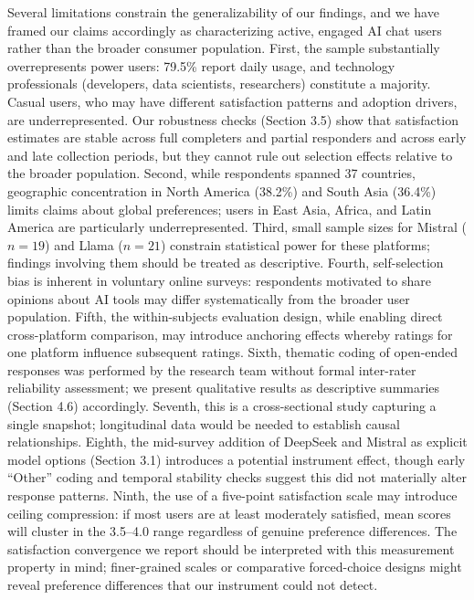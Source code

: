 \documentclass[10pt,twocolumn]{article}
\begin{document}
Several limitations constrain the generalizability of our findings, and we have framed our claims accordingly as characterizing active, engaged AI chat users rather than the broader consumer population. First, the sample substantially overrepresents power users: 79.5\% report daily usage, and technology professionals (developers, data scientists, researchers) constitute a majority. Casual users, who may have different satisfaction patterns and adoption drivers, are underrepresented. Our robustness checks (Section 3.5) show that satisfaction estimates are stable across full completers and partial responders and across early and late collection periods, but they cannot rule out selection effects relative to the broader population. Second, while respondents spanned 37 countries, geographic concentration in North America (38.2\%) and South Asia (36.4\%) limits claims about global preferences; users in East Asia, Africa, and Latin America are particularly underrepresented. Third, small sample sizes for Mistral ($n=19$) and Llama ($n=21$) constrain statistical power for these platforms; findings involving them should be treated as descriptive. Fourth, self-selection bias is inherent in voluntary online surveys: respondents motivated to share opinions about AI tools may differ systematically from the broader user population. Fifth, the within-subjects evaluation design, while enabling direct cross-platform comparison, may introduce anchoring effects whereby ratings for one platform influence subsequent ratings. Sixth, thematic coding of open-ended responses was performed by the research team without formal inter-rater reliability assessment; we present qualitative results as descriptive summaries (Section 4.6) accordingly. Seventh, this is a cross-sectional study capturing a single snapshot; longitudinal data would be needed to establish causal relationships. Eighth, the mid-survey addition of DeepSeek and Mistral as explicit model options (Section 3.1) introduces a potential instrument effect, though early ``Other'' coding and temporal stability checks suggest this did not materially alter response patterns. Ninth, the use of a five-point satisfaction scale may introduce ceiling compression: if most users are at least moderately satisfied, mean scores will cluster in the 3.5--4.0 range regardless of genuine preference differences. The satisfaction convergence we report should be interpreted with this measurement property in mind; finer-grained scales or comparative forced-choice designs might reveal preference differences that our instrument could not detect.
\end{document}
